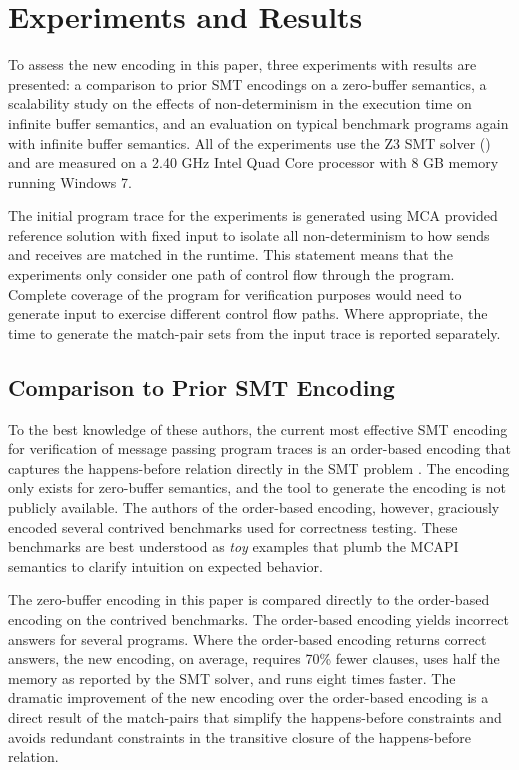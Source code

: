 \section{Experiments and Results}
To assess the new encoding in this paper, three experiments with results are presented: a comparison to prior SMT encodings on a zero-buffer semantics, a scalability study on the effects of non-determinism in the execution time on infinite buffer semantics, and an evaluation on typical benchmark programs again with infinite buffer semantics. All of the experiments use the Z3 SMT solver (\cite{demoura:tacas08}) and are measured on a 2.40 GHz Intel Quad Core processor with 8 GB memory running Windows 7.

The initial program trace for the experiments is generated using MCA provided reference solution with fixed input to isolate all non-determinism to how sends and receives are matched in the runtime. This statement means that the experiments only consider one path of control flow through the program. Complete coverage of the program for verification purposes would need to generate input to exercise different control flow paths.  Where appropriate, the time to generate the match-pair sets from the input trace is reported separately. 

\subsection{Comparison to Prior SMT Encoding}
To the best knowledge of these authors, the current most effective SMT encoding for verification of message passing program traces is an order-based encoding that captures the happens-before relation directly in the SMT problem \cite{elwakil:padtad10}. The encoding only exists for zero-buffer semantics, and the tool to generate the encoding is not publicly available. The authors of the order-based encoding, however, graciously encoded several contrived benchmarks used for correctness testing. These benchmarks are best understood as \emph{toy} examples that plumb the MCAPI semantics to clarify intuition on expected behavior.

The zero-buffer encoding in this paper is compared directly to the order-based encoding on the contrived benchmarks. The order-based encoding yields incorrect answers for several programs. Where the order-based encoding returns correct answers, the new encoding, on average, requires 70\% fewer clauses, uses half the memory as reported by the SMT solver, and runs eight times faster. The dramatic improvement of the new encoding over the order-based encoding is a direct result of the match-pairs that simplify the happens-before constraints and avoids redundant constraints in the transitive closure of the happens-before relation.

